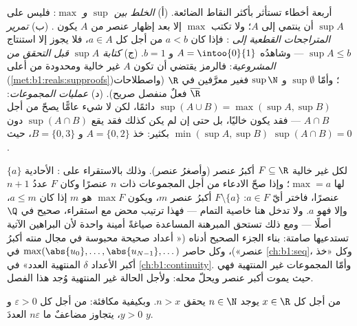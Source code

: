 \begin{remark}
أربعة أخطاء تستأثر بأكثر النقاط الضائعة. (أ) \emph{الخلط بين
$\sup$ و $\max$}: فليس على $\sup A$ أن ينتمي إلى $A$؛ ولا تكتب $\max$
إلا بعد إظهار عنصر من $A$ يكون .
(ب) \emph{تمرير المتراجحات القطعية إلى }: فإذا كان $a <
b$ من أجل كل $a \in A$، فلا يجوز إلا استنتاج $\sup A \leq b$ ---
وشاهدُه $A = \intoo{0}{1}$ و $b = 1$. (ج) \emph{كتابة $\sup A$
قبل التحقق من المشروعية}: فالرمز يقتضي أن تكون $A$ غير خالية
ومحدودة من أعلى (\cref{met:b1:reals:supproofs})؛ وأمّا $\sup \emptyset$
و $\sup \N$ فغير معرَّفين في $\R$ (واصطلاحات
$\overline\R$ فعلٌ منفصل صريح). (د) \emph{عمليات
المجموعات}: $\sup(A \cup B) = \max(\sup A, \sup B)$ دائمًا، لكن
لا شيء عامًّا يصحّ من أجل $A \cap B$ --- فقد يكون خاليًا، بل
حتى إن لم يكن كذلك فقد يقع $\sup(A \cap B)$ دون
$\min(\sup A, \sup B)$ بكثير: خذ $A = \{0, 2\}$ و $B = \{0, 3\}$،
حيث $\sup(A \cap B) = 0$.
\end{remark}

\begin{example}\label{ex:b1:reals:finitemax}
لكل  غير خالية $F \subseteq \R$ أكبرُ عنصر (وأصغرُ
عنصر). وذلك بالاستقراء على :  الأحادية
$\{a\}$ لها $\max = a$؛ وإذا صحّ الادعاء من أجل المجموعات ذات $n$ عنصرًا
وكان  $F$ عددُ $n + 1$ عنصرًا، فاختر أيّ $a \in F$:  $F
\setminus \{a\}$ أكبرُ عنصر $m$، ويكون $\max F$ هو $m$ إذا كان $a
\leq m$، وإلا فهو $a$. ولا تدخل هنا خاصية التمام --- فهذا ترتيب
محض مع استقراء، صحيح في $\Q$ أصلًا --- ومع ذلك تستحق المبرهنة المساعدة
صياغةً أمينة واحدة لأن البراهين الآتية تستدعيها
صامتة: بناء الجزء الصحيح أدناه (« أعداد صحيحة
محبوسة في مجال منته أكبرُ عنصر»)، وكل حاصر
$\max(\abs{u_0}, \dots, \abs{u_{N-1}}, \dots)$ في
\cref{ch:b1:seq}، وكل «خذ أكبر الأعداد $\delta$ المنتهية العدد» في \cref{ch:b1:continuity}. وأمّا المجموعات غير المنتهية فهي حيث
يموت أكبر عنصر ويحلّ  محله: ولأجل الحالة غير المنتهية
وُجد هذا الفصل.
\end{example}

\begin{theorem}\label{thm:b1:reals:archimedes}
من أجل كل $x \in \R$ يوجد $n \in \N$ يحقق $n > x$. وبكيفية مكافئة:
من أجل كل $\varepsilon > 0$ و $y > 0$، يتجاوز مضاعفٌ ما $n\varepsilon$
العددَ $y$.
\end{theorem}

